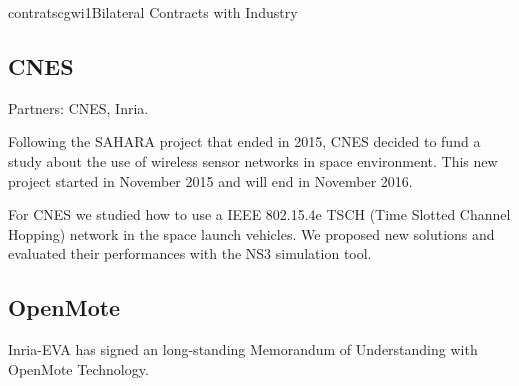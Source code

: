 \documentclass{ra2016}
\begin{document}
\begin{module}{contrats}{cgwi1}{Bilateral Contracts with Industry}

\subsection{CNES}

\begin{participants}
\end{participants}

Partners: CNES, Inria.

Following the SAHARA project that ended in 2015, CNES decided to fund a study about the use of wireless sensor networks in space environment.
This new project started in November 2015 and will end in November 2016.

For CNES we studied how to use a IEEE 802.15.4e TSCH (Time Slotted Channel Hopping) network in the space launch vehicles. We proposed new solutions and evaluated their performances with the NS3 simulation tool.\\

\subsection{OpenMote}

\begin{participants}
\end{participants}

Inria-EVA has signed an long-standing Memorandum of Understanding with OpenMote Technology.

\end{module}
\end{document}
